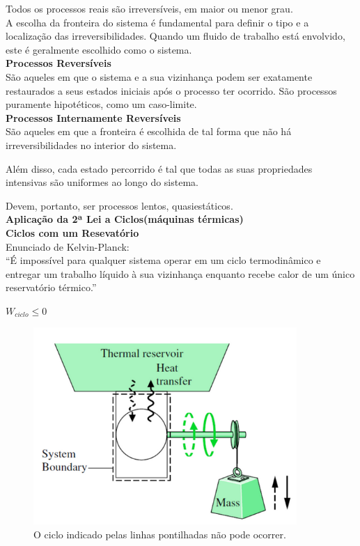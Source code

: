\documentclass[a4paper, 12pt]{article}
\begin{document}
Todos os processos reais são irreversíveis, em maior ou menor grau.\\

A escolha da fronteira do sistema é fundamental para definir o tipo e a
localização das irreversibilidades. Quando um fluido de trabalho está
envolvido, este é geralmente escolhido como o sistema.\\

\textbf{Processos Reversíveis}\\
São aqueles em que o sistema e a sua vizinhança podem ser
exatamente restaurados a seus estados iniciais após o processo ter
ocorrido.
São processos puramente hipotéticos, como um caso-limite.\\

\textbf{Processos Internamente Reversíveis}\\
São aqueles em que a fronteira é escolhida de tal forma que não há irreversibilidades
no interior do sistema.

Além disso, cada estado percorrido é tal que todas as suas propriedades intensivas são
uniformes ao longo do sistema.

Devem, portanto, ser processos lentos, quasiestáticos.\\

\textbf{Aplicação da 2ª Lei a Ciclos(máquinas térmicas)}\\

\textbf{Ciclos com um Resevatório}\\
Enunciado de Kelvin-Planck:\\
“É impossível para qualquer sistema operar em
um ciclo termodinâmico e entregar um
trabalho líquido à sua vizinhança enquanto
recebe calor de um único reservatório térmico.”
	\begin{center}
		\large
		$ W_{ciclo} \leq 0$
	\end{center}

	\begin{figure}[h]
		\includegraphics[width = 10cm]{re.png}
		\centering
		\caption{O ciclo indicado pelas linhas pontilhadas
			não pode ocorrer.}
	\end{figure}
\end{document}
